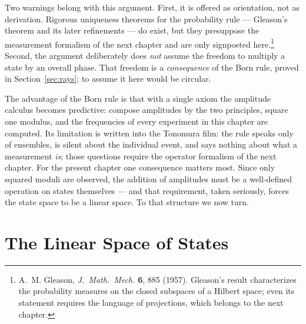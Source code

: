 Two warnings belong with this argument. First, it is offered as orientation, not as derivation. Rigorous uniqueness theorems for the probability rule --- Gleason's theorem and its later refinements --- do exist, but they presuppose the measurement formalism of the next chapter and are only signposted here.\footnote{A.~M. Gleason, \emph{J.~Math.~Mech.} \textbf{6}, 885 (1957). Gleason's result characterizes the probability measures on the closed subspaces of a Hilbert space; even its statement requires the language of projections, which belongs to the next chapter.} Second, the argument deliberately does \emph{not} assume the freedom to multiply a state by an overall phase. That freedom is a \emph{consequence} of the Born rule, proved in Section~\ref{sec:rays}; to assume it here would be circular.

The advantage of the Born rule is that with a single axiom the amplitude calculus becomes predictive: compose amplitudes by the two principles, square one modulus, and the frequencies of every experiment in this chapter are computed. Its limitation is written into the Tonomura film: the rule speaks only of ensembles, is silent about the individual event, and says nothing about what a measurement \emph{is}; those questions require the operator formalism of the next chapter. For the present chapter one consequence matters most. Since only squared moduli are observed, the addition of amplitudes must be a well-defined operation on states themselves --- and that requirement, taken seriously, forces the state space to be a linear space. To that structure we now turn.

\section{The Linear Space of States}
\label{sec:linearspace}


